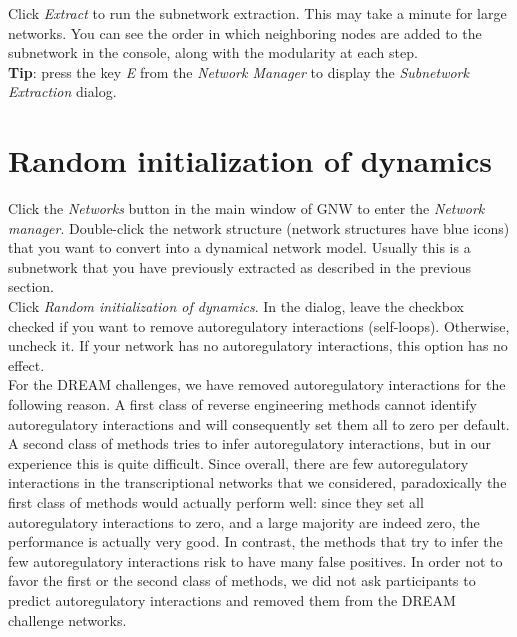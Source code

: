 \documentclass{llncs}
\begin{document}
Click \emph{Extract} to run the subnetwork extraction. This may take a minute for large networks. You can see the order in which neighboring nodes are added to the subnetwork in the console, along with the modularity at each step.\\

\textbf{Tip}: press the key \emph{E} from the \emph{Network Manager} to display the \emph{Subnetwork Extraction} dialog.



\section{Random initialization of dynamics}
\label{dynamics}

Click the \emph{Networks} button in the main window of GNW to enter the \emph{Network manager}. Double-click the network structure (network structures have blue icons) that you want to convert into a dynamical network model. Usually this is a subnetwork that you have previously extracted as described in the previous section.\\

Click \emph{Random initialization of dynamics}. In the dialog, leave the checkbox checked if you want to remove autoregulatory interactions (self-loops). Otherwise, uncheck it. If your network has no autoregulatory interactions, this option has no effect.\\

For the DREAM challenges, we have removed autoregulatory interactions for the following reason. A first class of reverse engineering methods cannot identify autoregulatory interactions and will consequently set them all to zero per default. A second class of methods tries to infer autoregulatory interactions, but in our experience this is quite difficult. Since overall, there are few autoregulatory interactions in the transcriptional networks that we considered, paradoxically the first class of methods would actually perform well: since they set all autoregulatory interactions to zero, and a large majority are indeed zero, the performance is actually very good. In contrast, the methods that try to infer the few autoregulatory interactions risk to have many false positives. In order not to favor the first or the second class of methods, we did not ask participants to predict autoregulatory interactions and removed them from the DREAM challenge networks.\\
\end{document}
